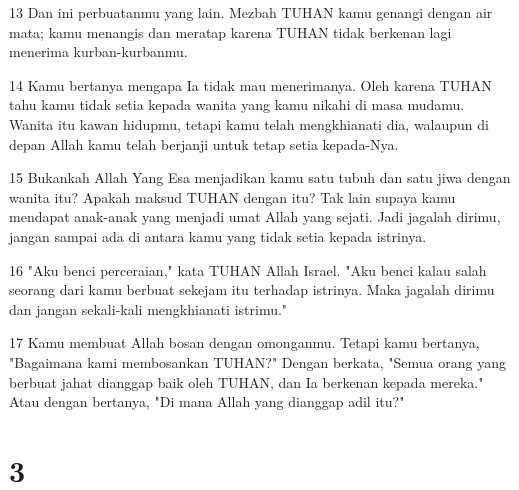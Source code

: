 \par 13 Dan ini perbuatanmu yang lain. Mezbah TUHAN kamu genangi dengan air mata; kamu menangis dan meratap karena TUHAN tidak berkenan lagi menerima kurban-kurbanmu.
\par 14 Kamu bertanya mengapa Ia tidak mau menerimanya. Oleh karena TUHAN tahu kamu tidak setia kepada wanita yang kamu nikahi di masa mudamu. Wanita itu kawan hidupmu, tetapi kamu telah mengkhianati dia, walaupun di depan Allah kamu telah berjanji untuk tetap setia kepada-Nya.
\par 15 Bukankah Allah Yang Esa menjadikan kamu satu tubuh dan satu jiwa dengan wanita itu? Apakah maksud TUHAN dengan itu? Tak lain supaya kamu mendapat anak-anak yang menjadi umat Allah yang sejati. Jadi jagalah dirimu, jangan sampai ada di antara kamu yang tidak setia kepada istrinya.
\par 16 "Aku benci perceraian," kata TUHAN Allah Israel. "Aku benci kalau salah seorang dari kamu berbuat sekejam itu terhadap istrinya. Maka jagalah dirimu dan jangan sekali-kali mengkhianati istrimu."
\par 17 Kamu membuat Allah bosan dengan omonganmu. Tetapi kamu bertanya, "Bagaimana kami membosankan TUHAN?" Dengan berkata, "Semua orang yang berbuat jahat dianggap baik oleh TUHAN, dan Ia berkenan kepada mereka." Atau dengan bertanya, "Di mana Allah yang dianggap adil itu?"

\chapter{3}

